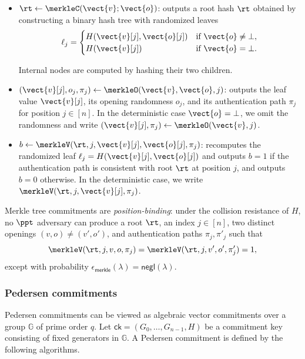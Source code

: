 \begin{itemize}
\item $\rt \gets \merkleC(\vect{v};\vect{o})$:
outputs a root hash $\rt$ obtained by constructing a binary hash tree with
randomized leaves
\[
\ell_j =
\begin{cases}
  H(\vect{v}[j], \vect{o}[j]) & \text{if } \vect{o}\neq\bot,\\
  H(\vect{v}[j]) & \text{if } \vect{o}=\bot.
\end{cases}
\]

Internal nodes are computed by hashing their two children.

\item $(\vect{v}[j],o_j,\pi_j) \gets \merkleO(\vect{v},\vect{o},j)$:
outputs the leaf value $\vect{v}[j]$, its opening randomness $o_j$, and its
authentication path $\pi_j$ for position $j\in[n]$.
In the deterministic case \(\vect{o}=\bot\), we omit the randomness and write
\((\vect{v}[j],\pi_j)\gets\merkleO(\vect{v},j)\).

\item $b \gets \merkleV(\rt,j,\vect{v}[j],\vect{o}[j],\pi_j)$:
recomputes the randomized leaf
$
  \ell_j = H(\vect{v}[j], \vect{o}[j])
$
and outputs $b=1$ if the authentication path is consistent with root $\rt$ at
position $j$, and outputs $b=0$ otherwise.
In the deterministic case, we write
\(\merkleV(\rt,j,\vect{v}[j],\pi_j)\).
\end{itemize}


Merkle tree commitments are \emph{position-binding}: under the collision
resistance of $H$, no $\ppt$ adversary can produce a root $\rt$, an index
$j\in[n]$, two distinct openings $(v,o)\neq(v',o')$, and authentication paths
$\pi_j,\pi'_j$ such that
\[
  \merkleV(\rt,j,v,o,\pi_j)
  =
  \merkleV(\rt,j,v',o',\pi'_j)
  =
  1,
\]
except with probability
$\epsilon_{\mathsf{merkle}}(\lambda)=\mathsf{negl}(\lambda)$.



\subsubsection{Pedersen commitments}
Pedersen commitments can be viewed as algebraic vector commitments over a group $\mathbb{G}$ of prime order $q$. Let $\mathsf{ck}=(G_0,\ldots,G_{n-1},H)$ be a commitment key consisting of fixed generators in $\mathbb{G}$. A Pedersen commitment is defined by the following algorithms.

